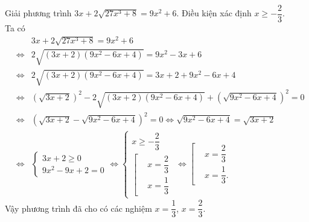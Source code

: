 \begin{ex}%
 Giải phương trình $3x + 2\sqrt{27x^3 + 8} = 9x^2 + 6$.
 \loigiai
  {
  Điều kiện xác định $x \geq -\dfrac{2}{3}$.\\
  Ta có
  \allowdisplaybreaks
  \begin{eqnarray*}
   & & 3x + 2\sqrt{27x^3 + 8} = 9x^2 + 6\\
   &\Leftrightarrow & 2\sqrt{(3x+2)(9x^2 - 6x + 4)} = 9x^2 - 3x + 6\\
   &\Leftrightarrow & 2\sqrt{(3x+2)(9x^2 - 6x + 4)} = 3x+2 + 9x^2-6x+4\\
   &\Leftrightarrow & \left(\sqrt{3x+2}\right)^2 - 2\sqrt{(3x+2)(9x^2 - 6x + 4)} + \left(\sqrt{9x^2 - 6x + 4}\right)^2 = 0\\
   &\Leftrightarrow &\left(\sqrt{3x+2}-\sqrt{9x^2-6x+4}\right)^2 = 0 \Leftrightarrow \sqrt{9x^2 - 6x + 4} = \sqrt{3x+2}\\
   &\Leftrightarrow &\begin{cases} 3x+2 \geq 0 \\ 9x^2 - 9x + 2 = 0\end{cases} \Leftrightarrow \begin{cases} x \geq -\dfrac{2}{3} \\ \left[\begin{aligned} & x=\dfrac{2}{3} \\& x=\dfrac{1}{3} \end{aligned}\right. \end{cases} \Leftrightarrow \left[\begin{aligned} & x=\dfrac{2}{3} \\& x=\dfrac{1}{3}. \end{aligned}\right.
  \end{eqnarray*}
  Vậy phương trình đã cho có các nghiệm $x = \dfrac{1}{3}$, $x = \dfrac{2}{3}$.
  }
\end{ex}

